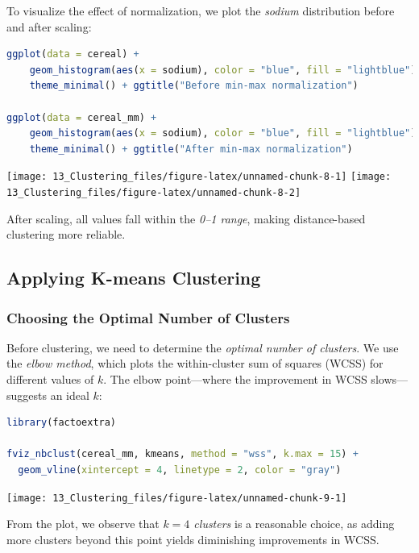 \documentclass[
  11pt,
]{book}
\theoremstyle{definition}
\theoremstyle{definition}
\theoremstyle{definition}
\theoremstyle{definition}
\theoremstyle{remark}
\begin{document}
To visualize the effect of normalization, we plot the \emph{sodium} distribution before and after scaling:

\begin{lstlisting}[language=R]
ggplot(data = cereal) +
    geom_histogram(aes(x = sodium), color = "blue", fill = "lightblue") +
    theme_minimal() + ggtitle("Before min-max normalization")

ggplot(data = cereal_mm) +
    geom_histogram(aes(x = sodium), color = "blue", fill = "lightblue") + 
    theme_minimal() + ggtitle("After min-max normalization")
\end{lstlisting}

\texttt{[image: 13\_Clustering\_files/figure-latex/unnamed-chunk-8-1]} \texttt{[image: 13\_Clustering\_files/figure-latex/unnamed-chunk-8-2]}

After scaling, all values fall within the \emph{0--1 range}, making distance-based clustering more reliable.

\subsection{Applying K-means Clustering}\label{applying-k-means-clustering}

\subsubsection*{Choosing the Optimal Number of Clusters}\label{choosing-the-optimal-number-of-clusters}


Before clustering, we need to determine the \emph{optimal number of clusters}. We use the \emph{elbow method}, which plots the within-cluster sum of squares (WCSS) for different values of \(k\). The elbow point---where the improvement in WCSS slows---suggests an ideal \(k\):

\begin{lstlisting}[language=R]
library(factoextra)

fviz_nbclust(cereal_mm, kmeans, method = "wss", k.max = 15) + 
  geom_vline(xintercept = 4, linetype = 2, color = "gray")
\end{lstlisting}

\begin{center}\texttt{[image: 13\_Clustering\_files/figure-latex/unnamed-chunk-9-1]} \end{center}

From the plot, we observe that \emph{\(k = 4\) clusters} is a reasonable choice, as adding more clusters beyond this point yields diminishing improvements in WCSS.
\end{document}
